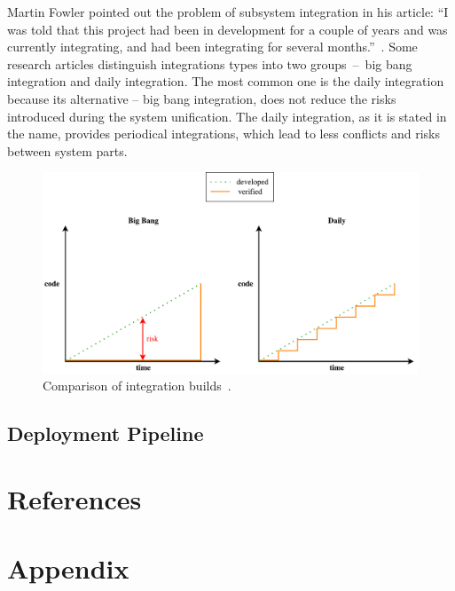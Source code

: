 \documentclass[12pt,a4paper]{article}
\newcommand{\uv}[1]{``#1''}
\theoremstyle{definition}
\begin{document}
        Martin Fowler pointed out the problem of subsystem integration in his article: \uv{I was told that this project had been in development for a couple of years and was currently integrating, and had been integrating for several months.}~\cite{ci2}. Some research articles distinguish integrations types into two groups~--~big bang integration and daily integration. The most common one is the daily integration because its alternative -- big bang integration, does not reduce the risks introduced during the system unification. The daily integration, as it is stated in the name, provides periodical integrations, which lead to less conflicts and risks between system parts.

        \begin{figure}[H]
            \centering
            \includegraphics[scale=0.5]{img/big_bang_vs_daily_build.pdf}
            \caption{Comparison of integration builds~\cite{FITMT21007}.}
            \label{fig:cd}
        \end{figure}


    \subsection{Deployment Pipeline}


\newpage

\section{References}

\begin{flushleft}
    
\end{flushleft}

\newpage

\section{Appendix}
\end{document}
